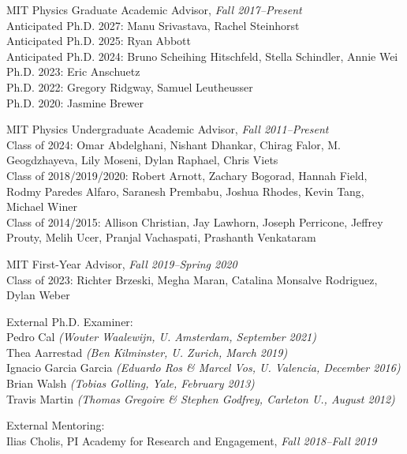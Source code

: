 \item MIT Physics Graduate Academic Advisor, \emph{Fall 2017--Present}
\\ Anticipated Ph.D. 2027: Manu Srivastava, Rachel Steinhorst
\\ Anticipated Ph.D. 2025: Ryan Abbott
\\ Anticipated Ph.D. 2024: Bruno Scheihing Hitschfeld, Stella Schindler, Annie Wei
\\ Ph.D. 2023: Eric Anschuetz
\\ Ph.D. 2022: Gregory Ridgway, Samuel Leutheusser
\\ Ph.D. 2020: Jasmine Brewer
\item MIT Physics Undergraduate Academic Advisor, \emph{Fall 2011--Present}
\\ Class of 2024: Omar Abdelghani, Nishant Dhankar, Chirag Falor, M. Geogdzhayeva, Lily Moseni, Dylan Raphael, Chris Viets
\\ Class of 2018/2019/2020: Robert Arnott, Zachary Bogorad, Hannah Field, Rodmy Paredes Alfaro, Saranesh Prembabu, Joshua Rhodes, Kevin Tang, Michael Winer
\\ Class of 2014/2015: Allison Christian, Jay Lawhorn, Joseph Perricone, Jeffrey Prouty, Melih Ucer, Pranjal Vachaspati, Prashanth Venkataram
\item MIT First-Year Advisor, \emph{Fall 2019--Spring 2020}
\\ Class of 2023: Richter Brzeski, Megha Maran, Catalina Monsalve Rodriguez, Dylan Weber

\item External Ph.D. Examiner:
\\ Pedro Cal \textit{(Wouter Waalewijn, U. Amsterdam, September 2021)}
\\ Thea Aarrestad \textit{(Ben Kilminster, U. Zurich, March 2019)}
\\ Ignacio Garcia Garcia \textit{(Eduardo Ros \& Marcel Vos, U. Valencia, December 2016)}
\\ Brian Walsh \textit{(Tobias Golling, Yale, February 2013)}
\\ Travis Martin \textit{(Thomas Gregoire \& Stephen Godfrey, Carleton U., August 2012)}

\item External Mentoring:
\\ Ilias Cholis, PI Academy for Research and Engagement, \emph{Fall 2018--Fall 2019}

\el
